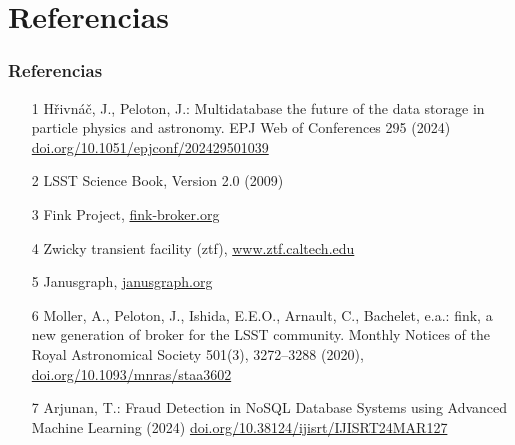\documentclass{beamer}
\newcommand{\myref}[2]{
    {\color{blue}\href{#1}{#2}}
}
\begin{document}
\section{Referencias}
\begin{frame}
\frametitle{Referencias}
    \begin{itemize}
    	\item[1] Hřivnáč, J., Peloton, J.: Multidatabase the future of the data storage in particle physics and astronomy. EPJ Web of Conferences 295 (2024) \myref{https://doi.org/10.1051/epjconf/202429501039}{doi.org/10.1051/epjconf/202429501039}

        \item[2] LSST Science Book, Version 2.0 (2009)

        \item[3]  Fink Project,\myref{https://fink-broker.org/}{fink-broker.org}
        
        \item[4] Zwicky transient facility (ztf),\myref{https://www.ztf.caltech.edu/}{www.ztf.caltech.edu}
        
        \item[5] Janusgraph,\myref{https://janusgraph.org/}{janusgraph.org}

        \item[6] Moller, A., Peloton, J., Ishida, E.E.O., Arnault, C., Bachelet, e.a.: fink, a new generation of broker for the LSST community. Monthly Notices of the Royal Astronomical Society 501(3), 3272–3288 (2020), \myref{https://doi.org/10.1093/mnras/staa3602}{doi.org/10.1093/mnras/staa3602}

        \item[7] Arjunan, T.: Fraud Detection in NoSQL Database Systems using Advanced Machine Learning (2024) \myref{https://doi.org/10.38124/ijisrt/IJISRT24MAR127}{doi.org/10.38124/ijisrt/IJISRT24MAR127}
    \end{itemize}
\end{frame}
\end{document}
